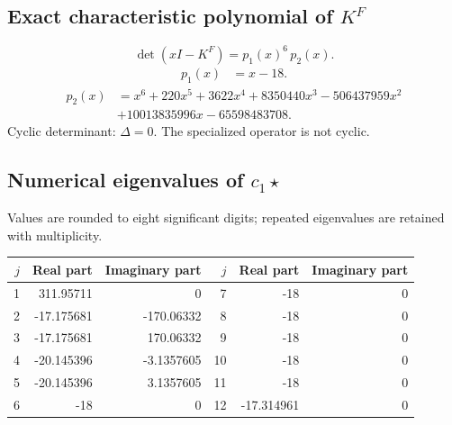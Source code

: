 \documentclass[10pt,a4paper]{article}
\begin{document}
\subsection*{Exact characteristic polynomial of $K^F$}
\[\det(xI-K^F)=p_{1}(x)^{6}\,p_{2}(x).\]
\[\begin{aligned}p_{1}(x)&=x - 18.\end{aligned}\]
\[\begin{aligned}p_{2}(x)&=x^{6} + 220 x^{5} + 3622 x^{4} + 8350440 x^{3} - 506437959 x^{2}\\&+10013835996 x - 65598483708.\end{aligned}\]
Cyclic determinant: $\Delta=0$. The specialized operator is not cyclic.
\subsection*{Numerical eigenvalues of $c_1\star$}
Values are rounded to eight significant digits; repeated eigenvalues are retained with multiplicity.
\begin{center}\small\begin{tabular}{rrr@{\qquad}rrr}\toprule $j$ & Real part & Imaginary part & $j$ & Real part & Imaginary part\\\midrule
1 & 311.95711 & 0 & 7 & -18 & 0\\
2 & -17.175681 & -170.06332 & 8 & -18 & 0\\
3 & -17.175681 & 170.06332 & 9 & -18 & 0\\
4 & -20.145396 & -3.1357605 & 10 & -18 & 0\\
5 & -20.145396 & 3.1357605 & 11 & -18 & 0\\
6 & -18 & 0 & 12 & -17.314961 & 0\\
\bottomrule\end{tabular}\end{center}
\end{document}

